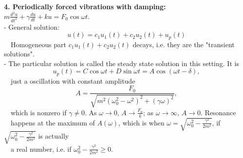 \documentclass[11pt]{article}
\numberwithin{equation}{section}
\begin{document}
\noindent \textbf{4. Periodically forced vibrations with damping: } $m\frac{d^2u}{dt^2}+\gamma\frac{du}{dt}+ku=F_0\cos \omega t$. \\
\indent - General solution:
\[u(t)=c_1u_1(t)+c_2u_2(t)+u_p(t)\]
\indent \ \ Homogeneous part $c_1u_1(t)+c_2u_2(t)$ decays, i.e. they are the "transient solutions".\\
\indent - The particular solution is called the steady state solution in this setting.  It is 
 \[u_p(t)=C\cos \omega t+D\sin \omega  t=A\cos(\omega t-\delta),\]
\indent \ \ just a oscillation with constant amplitude  
\[ A=\frac{F_0}{\sqrt{m^2(\omega_0^2-\omega^2)^2+(\gamma\omega)^2}},\] 
\indent \ \ which is nonzero if $\gamma\neq 0$.
As $\omega\to 0$, $A\to \frac{F_0}{k}$; as $\omega\to \infty$, $A\to 0$.  Resonance\\
\indent \ \  happens at the maximum of $A(\omega)$, which is when $\omega= \sqrt{\omega_0^2-\frac{\gamma^2}{2m^2}}$, if $\sqrt{\omega_0^2-\frac{\gamma^2}{2m^2}}$ is actually\\
\indent \ \  a real number, i.e. if $\omega_0^2-\frac{\gamma^2}{2m^2}\geq 0$.\\ 
\end{document}
